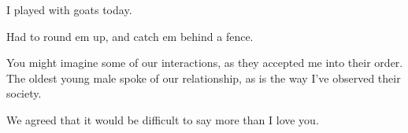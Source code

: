 

I played with goats today.

Had to round em up, and catch em behind a fence.

You might imagine some of our interactions, as they accepted me into
their order.  The oldest young male spoke of our relationship, as is
the way I've observed their society.

We agreed that it would be difficult to say more than I love you.

\bye

